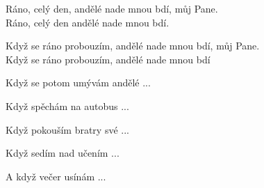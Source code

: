
\cho{}
Ráno, celý den, andělé nade mnou bdí, můj Pane.\\
Ráno, celý den andělé nade mnou bdí.

\ve{}
Když se ráno probouzím, andělé nade mnou bdí, můj Pane.\\
Když se ráno probouzím, andělé nade mnou bdí

\ve{}
Když se potom umývám andělé ...

\ve{}
Když spěchám na autobus ...

\ve{}
Když pokouším bratry své ...

\ve{}
Když sedím nad učením ...

\ve{}
A když večer usínám ...


\esong